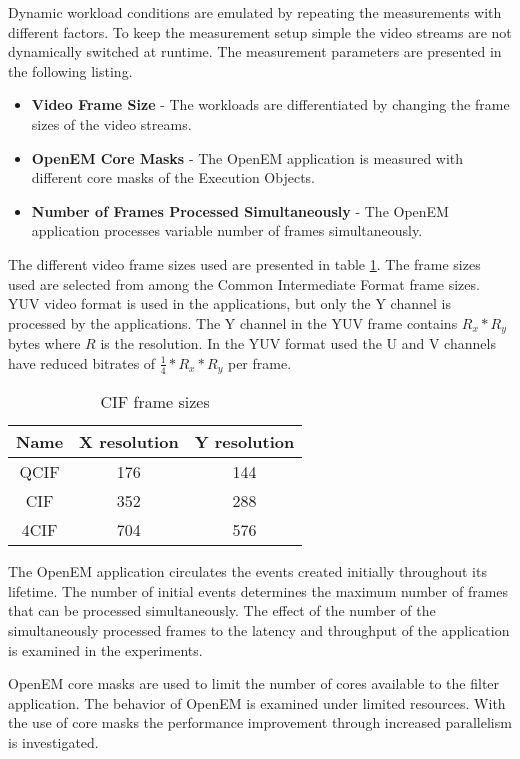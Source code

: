 Dynamic workload conditions are emulated by repeating the measurements with different factors. To keep the measurement setup simple the video streams are not dynamically switched at runtime. The measurement parameters are presented in the following listing.

\begin{itemize}
    \item \textbf{Video Frame Size} - The workloads are differentiated by changing the frame sizes of the video streams.
    \item \textbf{OpenEM Core Masks} - The OpenEM application is measured with different core masks of the Execution Objects.
    \item \textbf{Number of Frames Processed Simultaneously} - The OpenEM application processes variable number of frames simultaneously.
\end{itemize}

The different video frame sizes used are presented in table \ref{tab:cif_frames}. The frame sizes used are selected from among the Common Intermediate Format frame sizes. YUV video format is used in the applications, but only the Y channel is processed by the applications. The Y channel in the YUV frame contains $R_{x} * R_{y}$ bytes where $R$ is the resolution. In the YUV format used the U and V channels have reduced bitrates of $\frac{1}{4} * R_{x} * R_{y}$ per frame.

\begin{table}
    \begin{center}
        \begin{tabular}{ c c c }
            Name  & X resolution  & Y resolution \\ \hline
            QCIF  & 176           & 144          \\ \hline
            CIF   & 352           & 288          \\ \hline
            4CIF  & 704           & 576          \\ \hline
        \end{tabular}
        \caption{CIF frame sizes}
        \label{tab:cif_frames}
    \end{center}
\end{table}

The OpenEM application circulates the events created initially throughout its lifetime. The number of initial events determines the maximum number of frames that can be processed simultaneously. The effect of the number of the simultaneously processed frames to the latency and throughput of the application is examined in the experiments.

OpenEM core masks are used to limit the number of cores available to the filter application. The behavior of OpenEM is examined under limited resources. With the use of core masks the performance improvement through increased parallelism is investigated.

